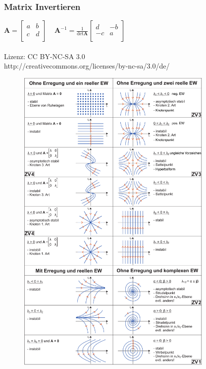 \documentclass[a4paper,twocolumn,10pt]{article}
\begin{document}
\subsubsection*{Matrix Invertieren}
$\textbf{A} = \begin{bmatrix}
  a & b \\
  c & d \\
\end{bmatrix}\;\;\;\; \textbf{A}^{-1} = \frac{1}{\det \textbf{A}} \begin{bmatrix}
  d & -b \\
  -c & a \\
\end{bmatrix} $
\\\\
Lizenz: CC BY-NC-SA 3.0\\
http://creativecommons.org/licenses/by-nc-sa/3.0/de/
\newpage
\begin{figure}
\begin{center}
\includegraphics[width=0.85\textwidth]{img/Phasenportraits-annotated}
\end{center}
\end{figure}
\end{document}
